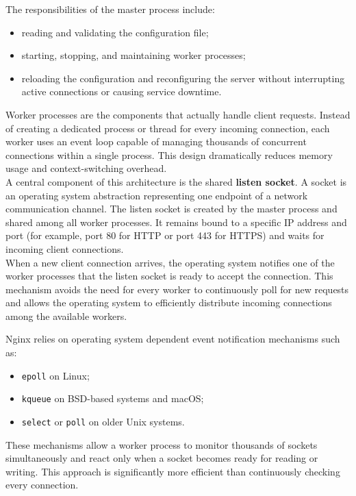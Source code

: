\documentclass{scrbook}
\begin{document}
	The responsibilities of the master process include:
	\begin{itemize}
		\item reading and validating the configuration file;
		\item starting, stopping, and maintaining worker processes;
		\item reloading the configuration and reconfiguring the server without interrupting active connections or causing service downtime.
	\end{itemize}
	
	Worker processes are the components that actually handle client requests. Instead of creating a dedicated process or thread for every incoming connection, each worker uses an event loop capable of managing thousands of concurrent connections within a single process. This design dramatically reduces memory usage and context-switching overhead.\\
	
	A central component of this architecture is the shared \textbf{listen socket}. A socket is an operating system abstraction representing one endpoint of a network communication channel. The listen socket is created by the master process and shared among all worker processes. It remains bound to a specific IP address and port (for example, port 80 for HTTP or port 443 for HTTPS) and waits for incoming client connections.\\
	
	When a new client connection arrives, the operating system notifies one of the worker processes that the listen socket is ready to accept the connection. This mechanism avoids the need for every worker to continuously poll for new requests and allows the operating system to efficiently distribute incoming connections among the available workers.\newpage
	
	Nginx relies on operating system dependent event notification mechanisms such as:
	\begin{itemize}
		\item \texttt{epoll} on Linux;
		\item \texttt{kqueue} on BSD-based systems and macOS;
		\item \texttt{select} or \texttt{poll} on older Unix systems.
	\end{itemize}
	
	These mechanisms allow a worker process to monitor thousands of sockets simultaneously and react only when a socket becomes ready for reading or writing. This approach is significantly more efficient than continuously checking every connection.\\
	
\end{document}
